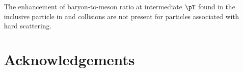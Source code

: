 \documentclass[ALICE,manyauthors]{cernphprep}
\begin{document}
The enhancement of baryon-to-meson ratio at intermediate $\pT$ found in the inclusive particle in \pp and \pPb collisions are not present for particles associated with hard scattering.

\newenvironment{acknowledgement}{\relax}{\relax}
\begin{acknowledgement}
\section*{Acknowledgements}
%

\end{acknowledgement}




\newpage
\appendix
\end{document}
